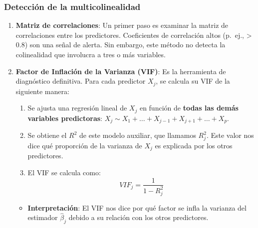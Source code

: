 \documentclass[
  letterpaper,
  DIV=11,
  numbers=noendperiod]{scrreprt}
\providecommand{\tightlist}{%
  \setlength{\itemsep}{0pt}\setlength{\parskip}{0pt}}
\begin{document}
\subsubsection{Detección de la
multicolinealidad}\label{detecciuxf3n-de-la-multicolinealidad}

\begin{enumerate}
\def\labelenumi{\arabic{enumi}.}
\item
  \textbf{Matriz de correlaciones}: Un primer paso es examinar la matriz
  de correlaciones entre los predictores. Coeficientes de correlación
  altos (p.~ej., \textgreater{} 0.8) son una señal de alerta. Sin
  embargo, este método no detecta la colinealidad que involucra a tres o
  más variables.
\item
  \textbf{Factor de Inflación de la Varianza (VIF)}: Es la herramienta
  de diagnóstico definitiva. Para cada predictor \(X_j\), se calcula su
  VIF de la siguiente manera:

  \begin{enumerate}
  \def\labelenumii{\arabic{enumii}.}
  \tightlist
  \item
    Se ajusta una regresión lineal de \(X_j\) en función de
    \textbf{todas las demás variables predictoras}:
    \(X_j \sim X_1 + \dots + X_{j-1} + X_{j+1} + \dots + X_p\).
  \item
    Se obtiene el \(R^2\) de este modelo auxiliar, que llamamos
    \(R_j^2\). Este valor nos dice qué proporción de la varianza de
    \(X_j\) es explicada por los otros predictores.
  \item
    El VIF se calcula como: \[VIF_j = \frac{1}{1 - R_j^2}\]
  \end{enumerate}

  \begin{itemize}
  \tightlist
  \item
    \textbf{Interpretación}: El VIF nos dice por qué factor se infla la
    varianza del estimador \(\hat{\beta}_j\) debido a su relación con
    los otros predictores.
  \end{itemize}
\end{enumerate}
\end{document}
